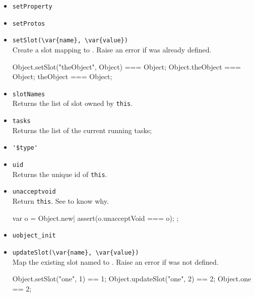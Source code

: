 \begin{itemize}
\begin{urbiscript}[firstnumber=last]
assert(setConstSlot("fortyTwo", 42) == 42);
fortyTwo = 51;
[00000000:error] !!! cannot modify const slot
\end{urbiscript}

\item \lstinline|setProperty|\\

\item \lstinline|setProtos|\\

\item \lstinline|setSlot(\var{name}, \var{value})|\\
  Create a slot  mapping to . Raise an error if
   was already defined.

\begin{urbiassert}[firstnumber=last]
Object.setSlot("theObject", Object) === Object;
Object.theObject === Object;
theObject === Object;
\end{urbiassert}

\item \lstinline|slotNames|\\
  Returns the list of slot owned by \lstinline|this|.

\item \lstinline|tasks|\\
  Returns the list of the current running tasks;

\item \lstinline|'$type'|\\ %

\item \lstinline|uid|\\
  Returns the unique id of \lstinline|this|.

\item \lstinline|unacceptvoid|\\
  Return \lstinline|this|.  See  to know why.
\begin{urbiscript}[firstnumber=last]
{
  var o = Object.new|
  assert(o.unacceptVoid === o);
};
\end{urbiscript}

\item \lstinline|uobject_init|\\

\item \lstinline|updateSlot(\var{name}, \var{value})|\\
  Map the existing slot named  to . Raise an
  error if  was not defined.
\begin{urbiassert}[firstnumber=last]
Object.setSlot("one", 1)    == 1;
Object.updateSlot("one", 2) == 2;
Object.one                  == 2;
\end{urbiassert}


\end{itemize}
